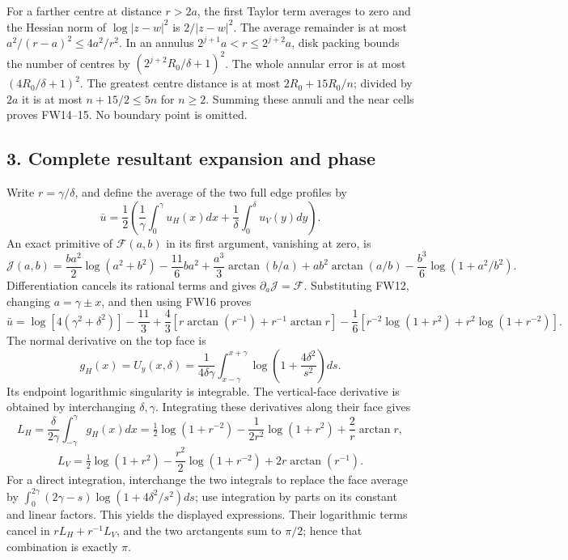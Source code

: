 \documentclass[11pt]{article}
\begin{document}
For a farther centre at distance \(r>2a\), the first Taylor term averages to zero and the Hessian norm of \(\log|z-w|^2\) is \(2/|z-w|^2\). The average remainder is at most \(a^2/(r-a)^2\le4a^2/r^2\). In an annulus \(2^{j+1}a<r\le2^{j+2}a\), disk packing bounds the number of centres by \((2^{j+2}R_0/\delta+1)^2\). The whole annular error is at most \((4R_0/\delta+1)^2\). The greatest centre distance is at most \(2R_0+15R_0/n\); divided by \(2a\) it is at most \(n+15/2\le5n\) for \(n\ge2\). Summing these annuli and the near cells proves FW14--15. No boundary point is omitted.

\subsection{3. Complete resultant expansion and phase}\label{complete-resultant-expansion-and-phase}

Write \(r=\gamma/\delta\), and define the average of the two full edge profiles by \[
\bar u=\frac12\left(\frac1\gamma\int_0^\gamma u_H(x)dx+
\frac1\delta\int_0^\delta u_V(y)dy\right).
\] An exact primitive of \(\mathscr F(a,b)\) in its first argument, vanishing at zero, is \[
\mathscr J(a,b)=\frac{ba^2}{2}\log(a^2+b^2)-\frac{11}{6}ba^2
+\frac{a^3}{3}\arctan(b/a)+ab^2\arctan(a/b)-\frac{b^3}{6}\log(1+a^2/b^2).
\tag{FW16}
\] Differentiation cancels its rational terms and gives \(\partial_a\mathscr J=\mathscr F\). Substituting FW12, changing \(a=\gamma\pm x\), and then using FW16 proves \[
\bar u=\log[4(\gamma^2+\delta^2)]-\frac{11}{3}
+\frac43[r\arctan(r^{-1})+r^{-1}\arctan r]
-\frac16[r^{-2}\log(1+r^2)+r^2\log(1+r^{-2})].
\tag{FW17}
\] The normal derivative on the top face is \[
g_H(x)=U_y(x,\delta)=\frac1{4\delta\gamma}
\int_{x-\gamma}^{x+\gamma}\log\left(1+\frac{4\delta^2}{s^2}\right)ds.
\] Its endpoint logarithmic singularity is integrable. The vertical-face derivative is obtained by interchanging \(\delta,\gamma\). Integrating these derivatives along their face gives \[
L_H=\frac\delta{2\gamma}\int_{-\gamma}^\gamma g_H(x)dx
=\tfrac12\log(1+r^{-2})-\frac1{2r^2}\log(1+r^2)+\frac2r\arctan r,
\] \[
L_V=\tfrac12\log(1+r^2)-\frac{r^2}{2}\log(1+r^{-2})+2r\arctan(r^{-1}).
\tag{FW18}
\] For a direct integration, interchange the two integrals to replace the face average by \(\int_0^{2\gamma}(2\gamma-s)\log(1+4\delta^2/s^2)ds\); use integration by parts on its constant and linear factors. This yields the displayed expressions. Their logarithmic terms cancel in \(rL_H+r^{-1}L_V\), and the two arctangents sum to \(\pi/2\); hence that combination is exactly \(\pi\).
\end{document}
